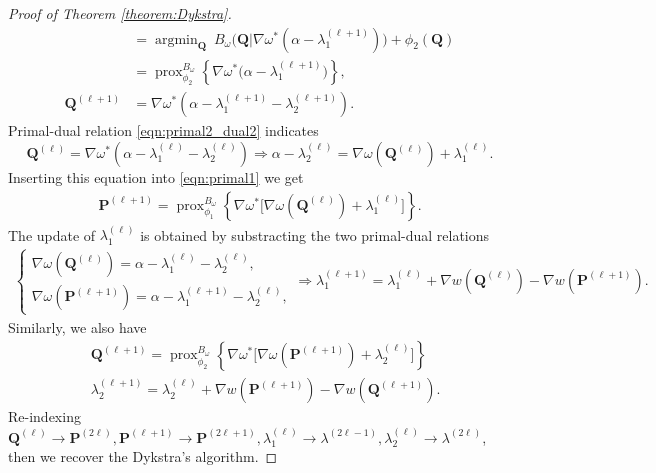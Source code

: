 \documentclass[11pt]{book}
\begin{document}
\begin{proof}[Proof of Theorem \ref{theorem:Dykstra}]
\begin{align}
        &= \operatorname{argmin}_{\mathbf{Q}}\ B_{\omega}\Big(\mathbf{Q}|\nabla\omega^*(\alpha-\lambda_1^{(\ell+1)})\Big) + \phi_2(\mathbf{Q}) \nonumber \\
        &= \operatorname{prox}_{\phi_2}^{B_{\omega}}\left\{ \nabla\omega^*\Big(\alpha-\lambda_1^{(\ell+1)}\Big) \right\}, \tag{P2} \\
        \mathbf{Q}^{(\ell+1)} &= \nabla \omega^*\left(\alpha - \lambda_1^{(\ell+1)} - \lambda_2^{(\ell+1)}\right). \tag{P2-D2} \label{eqn:primal2_dual2}
    \end{align}
    Primal-dual relation \eqref{eqn:primal2_dual2} indicates
    \[
    \mathbf{Q}^{(\ell)} = \nabla \omega^*\left(\alpha - \lambda_1^{(\ell)} - \lambda_2^{(\ell)}\right) \Rightarrow 
    \alpha - \lambda_2^{(\ell)} = \nabla\omega(\mathbf{Q}^{(\ell)}) + \lambda_1^{(\ell)}.
    \]
    Inserting this equation into \eqref{eqn:primal1} we get
    \begin{align}
        \mathbf{P}^{(\ell+1)} = \operatorname{prox}_{\phi_1}^{B_{\omega}}\left\{ \nabla\omega^*\Big[ \nabla\omega(\mathbf{Q}^{(\ell)}) + \lambda_1^{(\ell)} \Big] \right\}.
    \end{align}
    The update of $\lambda_1^{(\ell)}$ is obtained by substracting the two primal-dual relations
    \begin{align*}
        \begin{cases}
        \nabla\omega(\mathbf{Q}^{(\ell)}) = \alpha - \lambda_1^{(\ell)} - \lambda_2^{(\ell)}, \\
        \nabla\omega(\mathbf{P}^{(\ell+1)}) = \alpha - \lambda_1^{(\ell+1)} - \lambda_2^{(\ell)},
        \end{cases}
        \Rightarrow
        \lambda_1^{(\ell+1)} = \lambda_1^{(\ell)} + \nabla w(\mathbf{Q}^{(\ell)}) - \nabla w(\mathbf{P}^{(\ell+1)}).
    \end{align*}
    Similarly, we also have
    \begin{align*}
        & \mathbf{Q}^{(\ell+1)} = \operatorname{prox}_{\phi_2}^{B_{\omega}}\left\{ \nabla\omega^*\Big[ \nabla\omega(\mathbf{P}^{(\ell+1)}) + \lambda_2^{(\ell)} \Big] \right\} \\
        & \lambda_2^{(\ell+1)} = \lambda_2^{(\ell)} + \nabla w(\mathbf{P}^{(\ell+1)}) - \nabla w(\mathbf{Q}^{(\ell+1)}).
    \end{align*}
    Re-indexing $\mathbf{Q}^{(\ell)} \rightarrow \mathbf{P}^{(2\ell)}, \mathbf{P}^{(\ell+1)} \rightarrow \mathbf{P}^{(2\ell+1)}, \lambda_1^{(\ell)} \rightarrow \lambda^{(2\ell-1)}, \lambda_2^{(\ell)} \rightarrow \lambda^{(2\ell)}$, then we recover the Dykstra's algorithm.
\end{proof}
\end{document}
